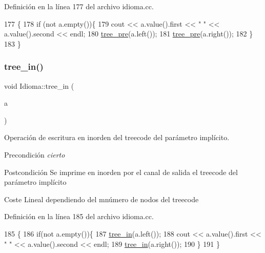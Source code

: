 Definición en la línea 177 del archivo idioma.\+cc.


\begin{DoxyCode}
177                                                        \{
178   \textcolor{keywordflow}{if} (not a.empty())\{
179     cout << a.value().first << \textcolor{stringliteral}{" "} << a.value().second << endl;
180     \hyperlink{class_idioma_aaf85e226b876366ea2cb1ebf5cf04388}{tree\_pre}(a.left());
181     \hyperlink{class_idioma_aaf85e226b876366ea2cb1ebf5cf04388}{tree\_pre}(a.right());
182   \}
183 \}
\end{DoxyCode}
\mbox{\label{class_idioma_a1fdf7b5bae642b911ab51b100f56e55f}} 
\subsubsection{\texorpdfstring{tree\+\_\+in()}{tree\_in()}}
{\footnotesize\ttfamily void Idioma\+::tree\+\_\+in (\begin{DoxyParamCaption}\item[{const Bin\+Tree$<$ pair$<$ string, int $>$$>$ \&}]{a }\end{DoxyParamCaption})}



Operación de escritura en inorden del treecode del parámetro implícito. 

\begin{DoxyPrecond}{Precondición}
{\itshape cierto} 
\end{DoxyPrecond}
\begin{DoxyPostcond}{Postcondición}
Se imprime en inorden por el canal de salida el treecode del parámetro implícito 
\end{DoxyPostcond}
\begin{DoxyParagraph}{Coste}
Lineal dependiendo del mnúmero de nodos del treecode 
\end{DoxyParagraph}


Definición en la línea 185 del archivo idioma.\+cc.


\begin{DoxyCode}
185                                                       \{
186   \textcolor{keywordflow}{if}(not a.empty())\{
187     \hyperlink{class_idioma_a1fdf7b5bae642b911ab51b100f56e55f}{tree\_in}(a.left());
188     cout << a.value().first << \textcolor{stringliteral}{" "} << a.value().second << endl;
189     \hyperlink{class_idioma_a1fdf7b5bae642b911ab51b100f56e55f}{tree\_in}(a.right());
190   \}
191 \}
\end{DoxyCode}
\mbox{\label{class_idioma_a0a4599da90aef15aa798a63ee6ad820e}} 
